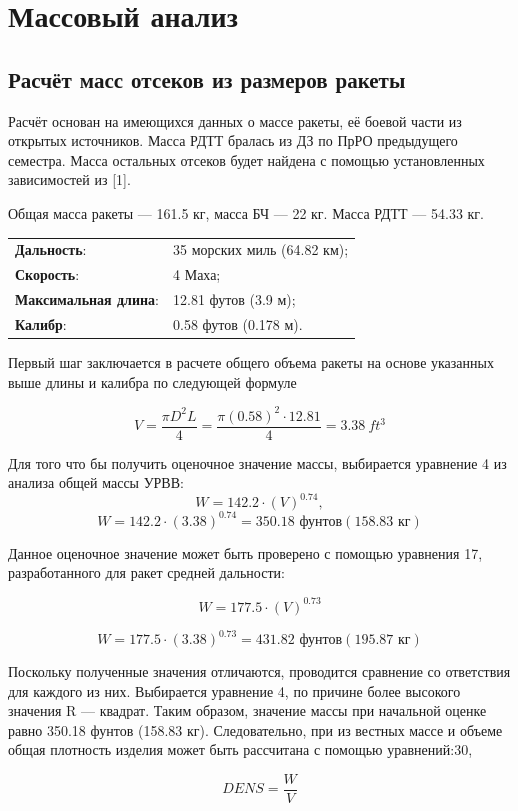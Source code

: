 \documentclass[a4paper,12pt]{report}
\begin{document}
\chapter{Массовый анализ}
\section{Расчёт масс отсеков из размеров ракеты}
Расчёт основан на имеющихся данных о массе ракеты, её боевой части из открытых источников. Масса РДТТ бралась из ДЗ по ПрРО предыдущего семестра. Масса остальных отсеков будет найдена
с помощью установленных зависимостей из [1].

Общая масса ракеты — 161.5 кг, масса БЧ — 22 кг. Масса РДТТ — 54.33 кг.

\begin{tabular}{ll}
    \textbf{Дальность}: & 35 морских миль (64.82 км); \\
    \textbf{Скорость}: & 4 Маха; \\
    \textbf{Максимальная длина}: & 12.81 футов (3.9 м); \\
    \textbf{Калибр}: & 0.58 футов (0.178 м).
\end{tabular}

Первый шаг заключается в расчете общего объема ракеты на основе
указанных выше длины и калибра по следующей формуле

\[V = \frac{\pi D^2 L}{4} = \frac{\pi (0.58)^2 \cdot 12.81}{4} = \SI{3.38}{ft^3}\]

Для того что
бы получить оценочное значение массы, выбирается уравнение 4 из анализа общей массы УРВВ:
\[W = 142.2\cdot(V)^{0.74},\]
\[W = 142.2 \cdot (3.38)^{0.74} = 350.18\text{ фунтов}(158.83\text{ кг})\] 

Данное оценочное значение может быть проверено с помощью уравнения 17, разработанного для ракет средней дальности:

\[ W = 177.5\cdot(V)^{0.73} \]

\[ W = 177.5\cdot(3.38)^{0.73} = 431.82 \text{ фунтов}(195.87\text{ кг}) \]

 Поскольку полученные значения отличаются, проводится сравнение со
ответствия для каждого из них. Выбирается уравнение 4, по причине более высокого значения R — квадрат. Таким образом, значение массы при
 начальной оценке равно 350.18 фунтов (158.83 кг). Следовательно, при из
вестных массе и объеме общая плотность изделия может быть рассчитана
 с помощью уравнений:30,


\[ \textit{DENS} = \frac{\textit{W}}{\textit{V}} \]
\end{document}

